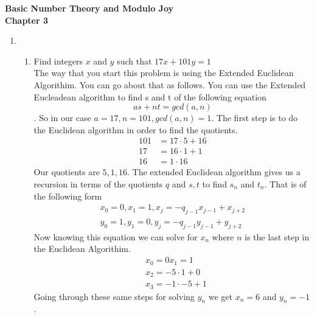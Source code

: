 \documentclass[12pt]{article}
\begin{document}
\begin{center}
      \textbf{Basic Number Theory and Modulo Joy\\
            Chapter 3}
\end{center}
\begin{enumerate}
      \item
            \begin{enumerate}

                  \item Find integers $x$ and $y$ such that $17x+101y =1$\\
                        The way that you start this problem is using the Extended Euclidean Algorithim. You can go about that as follows.
                        You can use the Extended Eucleadean algorithm to find s and t of the following equation \[
                              as+nt = gcd(a,n)
                        \].
                        So in our case $a = 17 ,n =101, gcd(a,n)=1 $.
                        The first step is to do the Euclidean algorithm in order to find the quotients.
                        \begin{align*}
                              101 & = 17\cdot 5 + 16 \\
                              17  & = 16\cdot 1 +1   \\
                              16  & = 1\cdot 16
                        \end{align*}
                        Our quotients are $5,1,16$. The extended Euclidean algorithm gives us a recursion in terms of the quotients $q$ and $s , t$ to find $s_n$ and $t_n$. That is of the following form
                        \begin{align*}
                              x_0 =0, x_1=1,x_j = -q_{j-1}x_{j-1}+x_{j+2} \\
                              y_0 =1, y_1=0,y_j = -q_{j-1}y_{j-1}+y_{j+2}
                        \end{align*}
                        Now knowing this equation we can solve for $x_n$ where $n$ is the last step in the Euclidean Algorithim.
                        \begin{align*}
                               & x_0 = 0 x_1 =1        \\
                               & x_2 = -5 \cdot 1 + 0  \\
                               & x_3 = -1 \cdot -5 + 1
                        \end{align*}
                        Going through these same steps for solving $y_n$ we get $x_n=6$ and $y_n = -1$.

\end{enumerate}
\end{enumerate}
\end{document}
